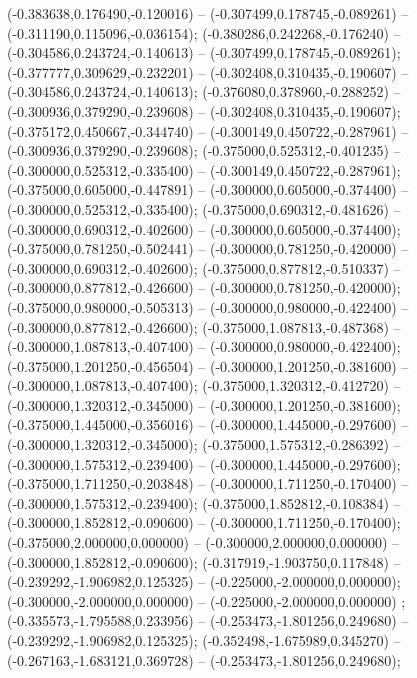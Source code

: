  (-0.383638,0.176490,-0.120016) -- (-0.307499,0.178745,-0.089261) -- (-0.311190,0.115096,-0.036154);
 (-0.380286,0.242268,-0.176240) -- (-0.304586,0.243724,-0.140613) -- (-0.307499,0.178745,-0.089261);
 (-0.377777,0.309629,-0.232201) -- (-0.302408,0.310435,-0.190607) -- (-0.304586,0.243724,-0.140613);
 (-0.376080,0.378960,-0.288252) -- (-0.300936,0.379290,-0.239608) -- (-0.302408,0.310435,-0.190607);
 (-0.375172,0.450667,-0.344740) -- (-0.300149,0.450722,-0.287961) -- (-0.300936,0.379290,-0.239608);
 (-0.375000,0.525312,-0.401235) -- (-0.300000,0.525312,-0.335400) -- (-0.300149,0.450722,-0.287961);
 (-0.375000,0.605000,-0.447891) -- (-0.300000,0.605000,-0.374400) -- (-0.300000,0.525312,-0.335400);
 (-0.375000,0.690312,-0.481626) -- (-0.300000,0.690312,-0.402600) -- (-0.300000,0.605000,-0.374400);
 (-0.375000,0.781250,-0.502441) -- (-0.300000,0.781250,-0.420000) -- (-0.300000,0.690312,-0.402600);
 (-0.375000,0.877812,-0.510337) -- (-0.300000,0.877812,-0.426600) -- (-0.300000,0.781250,-0.420000);
 (-0.375000,0.980000,-0.505313) -- (-0.300000,0.980000,-0.422400) -- (-0.300000,0.877812,-0.426600);
 (-0.375000,1.087813,-0.487368) -- (-0.300000,1.087813,-0.407400) -- (-0.300000,0.980000,-0.422400);
 (-0.375000,1.201250,-0.456504) -- (-0.300000,1.201250,-0.381600) -- (-0.300000,1.087813,-0.407400);
 (-0.375000,1.320312,-0.412720) -- (-0.300000,1.320312,-0.345000) -- (-0.300000,1.201250,-0.381600);
 (-0.375000,1.445000,-0.356016) -- (-0.300000,1.445000,-0.297600) -- (-0.300000,1.320312,-0.345000);
 (-0.375000,1.575312,-0.286392) -- (-0.300000,1.575312,-0.239400) -- (-0.300000,1.445000,-0.297600);
 (-0.375000,1.711250,-0.203848) -- (-0.300000,1.711250,-0.170400) -- (-0.300000,1.575312,-0.239400);
 (-0.375000,1.852812,-0.108384) -- (-0.300000,1.852812,-0.090600) -- (-0.300000,1.711250,-0.170400);
 (-0.375000,2.000000,0.000000) -- (-0.300000,2.000000,0.000000) -- (-0.300000,1.852812,-0.090600);
 (-0.317919,-1.903750,0.117848) -- (-0.239292,-1.906982,0.125325) -- (-0.225000,-2.000000,0.000000);
 (-0.300000,-2.000000,0.000000) -- (-0.225000,-2.000000,0.000000) ;
 (-0.335573,-1.795588,0.233956) -- (-0.253473,-1.801256,0.249680) -- (-0.239292,-1.906982,0.125325);
 (-0.352498,-1.675989,0.345270) -- (-0.267163,-1.683121,0.369728) -- (-0.253473,-1.801256,0.249680);
